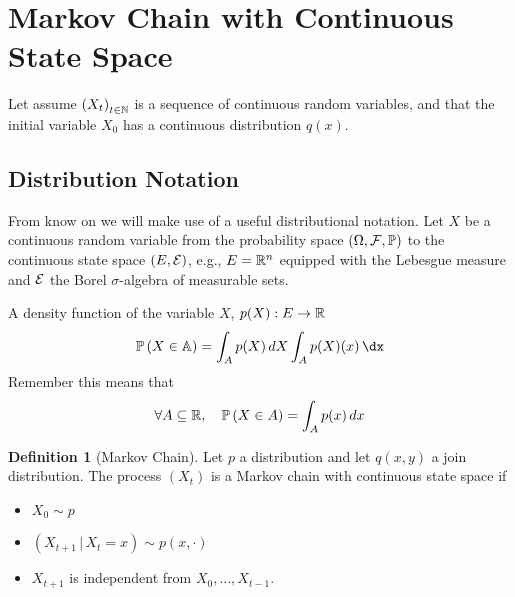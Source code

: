 \documentclass{report}
\theoremstyle{definition}
\newtheorem{defn}{Definition}
\begin{document}
\section{Markov Chain with Continuous State Space}
Let assume $\left(X_t \right)_{t\in\mathbb{N}}$ is a sequence of continuous random
variables, and that the initial variable $X_0$ has a continuous
distribution $q(x)$. 

\subsection{Distribution Notation}
From know on we will make use of a useful distributional notation.
Let $X$ be a continuous random variable from the probability space
$\left( \Omega,\mathcal{F},\mathbb{P} \right)$ to the continuous state space $\left(
E,\mathcal{E}  \right)$, e.g., $E=\mathbb{R}^n$ equipped with the Lebesgue measure and
$\mathcal{E}$ the Borel $\sigma$-algebra of measurable sets.

A density function of the variable $X$, $p(X):E\to\mathbb{R}$
\begin{equation}
  \Ph\left( X\in\A \right) = \int_A p(X)\, dX\int_Ap(X)(x)\,\dx
\end{equation}
Remember this means that
\begin{equation}
  \forall A\subseteq \mathbb{R},\quad \mathbb{P}\left( X\in A \right)=\int_A p(x)\,dx
  \label{eq:distribution}
\end{equation}
\begin{defn}[Markov Chain]
  Let $p$ a distribution and let $q(x,y)$ a join distribution. The process
$\left( X_t \right)$ is a Markov chain with continuous state space if
\begin{itemize}
  \item $X_0\sim p$
  \item $\left(X_{t+1}\,\vert\, X_t=x \right) \sim p(x,\cdot)$
  \item $X_{t+1}$ is independent from $X_0,\dots,X_{t-1}$.
\end{itemize}
\end{defn}
\end{document}
